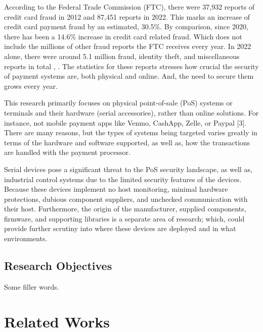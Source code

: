 \documentclass[conference]{IEEEtran}
\begin{document}
According to the Federal Trade Commission (FTC), there were 37,932 reports of credit card fraud in 2012 and 87,451 reports in 2022. This marks an increase of credit card payment fraud by an estimated, 30.5\%. By comparison, since 2020, there has been a 14.6\% increase in credit card related fraud. Which does not include the millions of other fraud reports the FTC receives every year. In 2022 alone, there were around 5.1 million fraud, identity theft, and miscellaneous reports in total \autocite{forthesentinelConsumerSentinelNetwork2022}, \autocite{ConsumerSentinelNetwork2023}. The statistics for these reports stresses how crucial the security of payment systems are, both physical and online. And, the need to secure them grows every year.

This research primarily focuses on physical point-of-sale (PoS) systems or terminals and their hardware (serial accessories), rather than online solutions. For instance, not mobile payment apps like Venmo, CashApp, Zelle, or Paypal [3]. There are many reasons, but the types of systems being targeted varies greatly in terms of the hardware and software supported, as well as, how the transactions are handled with the payment processor.

Serial devices pose a significant threat to the PoS security landscape, as well as, industrial control systems due to the limited security features of the devices. Because these devices implement no host monitoring, minimal hardware protections, dubious component suppliers, and unchecked communication with their host. Furthermore, the origin of the manufacturer, supplied components, firmware, and supporting libraries is a separate area of research; which, could provide further scrutiny into where these devices are deployed and in what environments.

\subsection{Research Objectives}

Some filler words.

\section{Related Works}
\end{document}
